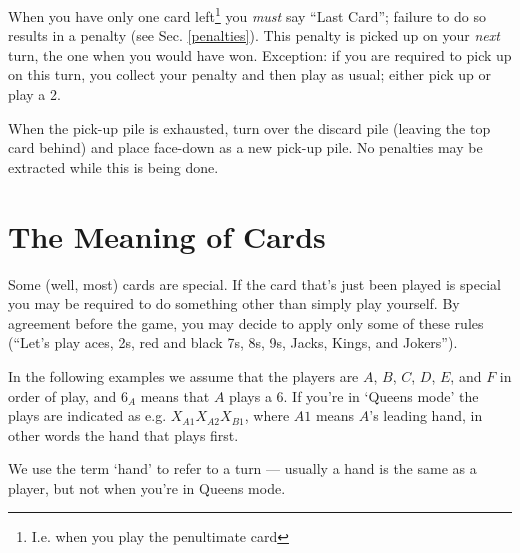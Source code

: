 \documentclass[12pt]{article}
\newcommand{\Sec}[1]{Sec. \ref{#1}}
\begin{document}
When you have only one card left\footnote{I.e. when you play the penultimate card} you \emph{must} say ``Last
Card''; failure to do so results in a penalty (see \Sec{penalties}).  This penalty is picked up on your \textit{next} turn, the one when you would have won. Exception: if you are required to pick up on this turn, you collect your penalty and then play as usual; either pick up or play a 2.

When the pick-up pile is exhausted, turn over the discard pile (leaving the top card behind) and
place face-down as a new pick-up pile.  No penalties may be extracted while this is being
done.

\section{The Meaning of Cards}
\label{specialCards}

Some (well, most) cards are special.  If the card that's just been played is special you may be required to
do something other than simply play yourself.  By agreement before the game, you may decide to apply only
some of these rules (``Let's play aces, 2s, red and black 7s, 8s, 9s, Jacks, Kings, and Jokers'').

In the following examples we assume that the players are $A$, $B$, $C$, $D$, $E$, and $F$ in order of play,
and $6_A$ means that $A$ plays a 6.  If you're in `Queens mode' the plays are indicated as e.g. $X_{A1} X_{A2} X_{B1}$,
where $A1$ means $A$'s leading hand, in other words the hand that plays first.

We use the term `hand' to refer to a turn --- usually a hand is the same as a player, but not when
you're in Queens mode.
\end{document}
